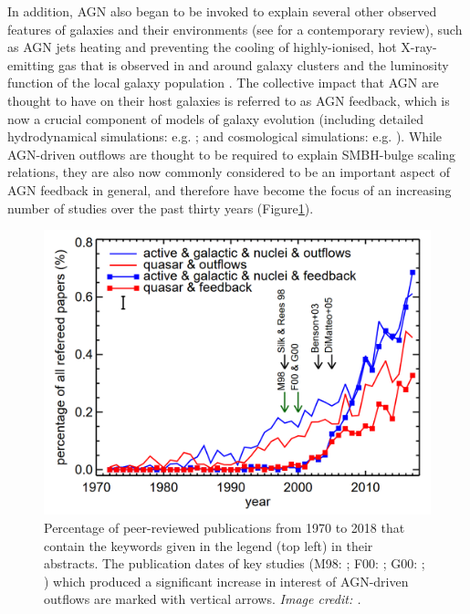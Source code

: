 In addition, AGN also began to be invoked to explain several other observed features of galaxies and their environments (see \citealt{Cattaneo2009} for a contemporary review), such as AGN jets heating and preventing the cooling of highly-ionised, hot X-ray-emitting gas that is observed in and around galaxy clusters \citep{McNamara2007, Gaspari2013} and the luminosity function of the local galaxy population \citep{Benson2003}. The collective impact that AGN are thought to have on their host galaxies is referred to as AGN feedback, which is now a crucial component of models of galaxy evolution (including detailed hydrodynamical simulations: e.g. \citealt{DiMatteo2005, Springel2005, Hopkins2010}; and cosmological simulations: e.g. \citealt{Schaye2015, Dave2019, Zinger2020}). While AGN-driven outflows are thought to be required to explain SMBH-bulge scaling relations, they are also now commonly considered to be an important aspect of AGN feedback in general, and therefore have become the focus of an increasing number of studies over the past thirty years (Figure\;\ref{fig: introduction: historical_context: galaxy_evolution: harrison2018_abstracts}).

\begin{figure}
    \centering
    \includegraphics[width=0.85\linewidth]{figures/introduction/harrison2018_abstracts.png}
    \caption[Cumulative number of published AGN-driven outflow studies since the early 1970s, taken from \citet{Harrison2018}.]{Percentage of peer-reviewed publications from 1970 to 2018 that contain the keywords given in the legend (top left) in their abstracts. The publication dates of key studies (M98: \citealt{Magorrian1998}; F00: \citealt{Ferrarese2000}; G00: \citealt{Gebhardt2000}; \citealt{Benson2003, DiMatteo2005}) which produced a significant increase in interest of AGN-driven outflows are marked with vertical arrows. \textit{Image credit: \citealt{Harrison2018}.}}
    \label{fig: introduction: historical_context: galaxy_evolution: harrison2018_abstracts}
\end{figure}

